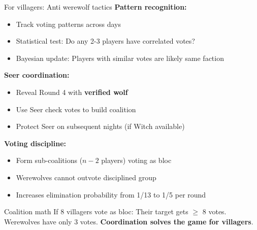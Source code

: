 \documentclass[10pt]{beamer}
\begin{document}
\begin{frame}{For villagers: Anti werewolf tactics}
  \textbf{Pattern recognition:}
  \begin{itemize}
    \item Track voting patterns across days
    \item Statistical test: Do any 2-3 players have correlated votes?
    \item Bayesian update: Players with similar votes are likely same faction
  \end{itemize}

  \vspace{0.3cm}
  \textbf{Seer coordination:}
  \begin{itemize}
    \item Reveal Round 4 with \textbf{verified wolf}
    \item Use Seer check votes to build coalition
    \item Protect Seer on subsequent nights (if Witch available)
  \end{itemize}

  \vspace{0.3cm}
  \textbf{Voting discipline:}
  \begin{itemize}
    \item Form sub-coalitions ($n-2$ players) voting as bloc
    \item Werewolves cannot outvote disciplined group
    \item Increases elimination probability from 1/13 to 1/5 per round
  \end{itemize}

  \vspace{0.3cm}
  \begin{exampleblock}{Coalition math}
    If 8 villagers vote as bloc: Their target gets $\geq$ 8 votes. Werewolves have only 3 votes. \textbf{Coordination solves the game for villagers}.
  \end{exampleblock}
\end{frame}
\end{document}
